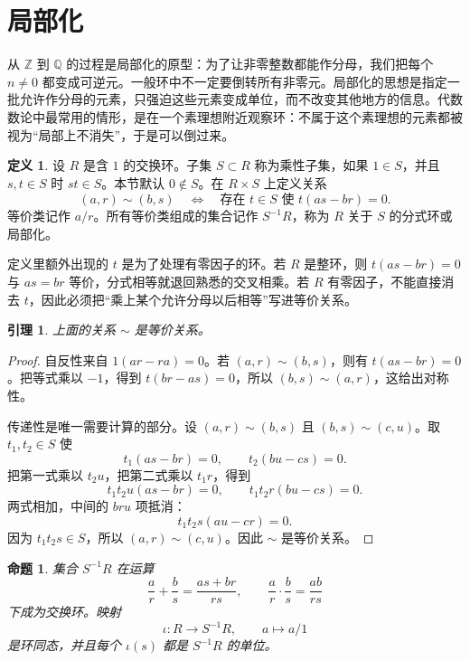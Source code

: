 \documentclass[11pt,a4paper,openany]{ctexbook}
\numberwithin{equation}{chapter}
\newcommand{\Q}{\mathbb{Q}}
\newcommand{\Z}{\mathbb{Z}}
\theoremstyle{plain}
\newtheorem{proposition}[theorem]{命题}
\newtheorem{lemma}[theorem]{引理}
\theoremstyle{definition}
\newtheorem{definition}[theorem]{定义}
\theoremstyle{remark}
\begin{document}
\section{局部化}

从 $\Z$ 到 $\Q$ 的过程是局部化的原型：为了让非零整数都能作分母，我们把每个 $n\ne0$ 都变成可逆元。一般环中不一定要倒转所有非零元。局部化的思想是指定一批允许作分母的元素，只强迫这些元素变成单位，而不改变其他地方的信息。代数数论中最常用的情形，是在一个素理想附近观察环：不属于这个素理想的元素都被视为“局部上不消失”，于是可以倒过来。

\begin{definition}
设 $R$ 是含 $1$ 的交换环。子集 $S\subset R$ 称为乘性子集，如果 $1\in S$，并且 $s,t\in S$ 时 $st\in S$。本节默认 $0\notin S$。在 $R\times S$ 上定义关系
\[
(a,r)\sim(b,s)\quad\Longleftrightarrow\quad \text{存在 }t\in S\text{ 使 }t(as-br)=0.
\]
等价类记作 $a/r$。所有等价类组成的集合记作 $S^{-1}R$，称为 $R$ 关于 $S$ 的分式环或局部化。
\end{definition}

定义里额外出现的 $t$ 是为了处理有零因子的环。若 $R$ 是整环，则 $t(as-br)=0$ 与 $as=br$ 等价，分式相等就退回熟悉的交叉相乘。若 $R$ 有零因子，不能直接消去 $t$，因此必须把“乘上某个允许分母以后相等”写进等价关系。

\begin{lemma}
上面的关系 $\sim$ 是等价关系。
\end{lemma}

\begin{proof}
自反性来自 $1(ar-ra)=0$。若 $(a,r)\sim(b,s)$，则有 $t(as-br)=0$。把等式乘以 $-1$，得到 $t(br-as)=0$，所以 $(b,s)\sim(a,r)$，这给出对称性。

传递性是唯一需要计算的部分。设 $(a,r)\sim(b,s)$ 且 $(b,s)\sim(c,u)$。取 $t_1,t_2\in S$ 使
\[
t_1(as-br)=0,\qquad t_2(bu-cs)=0.
\]
把第一式乘以 $t_2u$，把第二式乘以 $t_1r$，得到
\[
t_1t_2u(as-br)=0,\qquad t_1t_2r(bu-cs)=0.
\]
两式相加，中间的 $bru$ 项抵消：
\[
t_1t_2s(au-cr)=0.
\]
因为 $t_1t_2s\in S$，所以 $(a,r)\sim(c,u)$。因此 $\sim$ 是等价关系。
\end{proof}

\begin{proposition}
集合 $S^{-1}R$ 在运算
\[
\frac a r+\frac b s=\frac{as+br}{rs},\qquad
\frac a r\cdot\frac b s=\frac{ab}{rs}
\]
下成为交换环。映射
\[
\iota:R\longrightarrow S^{-1}R,\qquad a\longmapsto a/1
\]
是环同态，并且每个 $\iota(s)$ 都是 $S^{-1}R$ 的单位。
\end{proposition}
\end{document}
